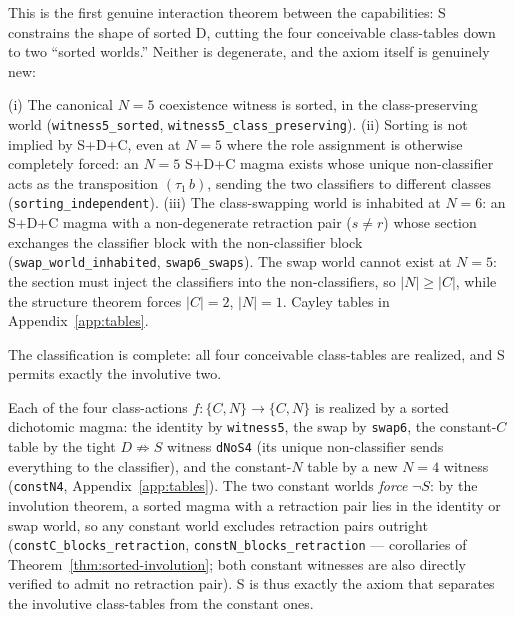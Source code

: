 \documentclass[sigconf,screen]{acmart}
\theoremstyle{remark}
\begin{document}
This is the first genuine interaction theorem between the capabilities: S constrains the shape of sorted D, cutting the four conceivable class-tables down to two ``sorted worlds.'' Neither is degenerate, and the axiom itself is genuinely new:

\begin{proposition}
\label{prop:sorting-witnesses}
(i) The canonical $N\!=\!5$ coexistence witness is sorted, in the class-preserving world (\texttt{witness5\_sorted}, \texttt{witness5\_class\_preserving}). (ii) Sorting is not implied by S+D+C, even at $N\!=\!5$ where the role assignment is otherwise completely forced: an $N\!=\!5$ S+D+C magma exists whose unique non-classifier acts as the transposition $(\tau_1\, b)$, sending the two classifiers to different classes (\texttt{sorting\_independent}). (iii) The class-swapping world is inhabited at $N\!=\!6$: an S+D+C magma with a non-degenerate retraction pair ($s \neq r$) whose section exchanges the classifier block with the non-classifier block (\texttt{swap\_world\_inhabited}, \texttt{swap6\_swaps}). The swap world cannot exist at $N\!=\!5$: the section must inject the classifiers into the non-classifiers, so $|N| \geq |C|$, while the structure theorem forces $|C| = 2$, $|N| = 1$. Cayley tables in Appendix~\ref{app:tables}.
\end{proposition}

The classification is complete: all four conceivable class-tables are realized, and S permits exactly the involutive two.

\begin{proposition}
\label{prop:four-tables}
Each of the four class-actions $f : \{C, N\} \to \{C, N\}$ is realized by a sorted dichotomic magma: the identity by \texttt{witness5}, the swap by \texttt{swap6}, the constant-$C$ table by the tight $D \not\Rightarrow S$ witness \texttt{dNoS4} (its unique non-classifier sends everything to the classifier), and the constant-$N$ table by a new $N\!=\!4$ witness (\texttt{constN4}, Appendix~\ref{app:tables}). The two constant worlds \emph{force} $\neg S$: by the involution theorem, a sorted magma with a retraction pair lies in the identity or swap world, so any constant world excludes retraction pairs outright (\texttt{constC\_blocks\_retraction}, \texttt{constN\_blocks\_retraction} --- corollaries of Theorem~\ref{thm:sorted-involution}; both constant witnesses are also directly verified to admit no retraction pair). S is thus exactly the axiom that separates the involutive class-tables from the constant ones.
\end{proposition}
\end{document}
